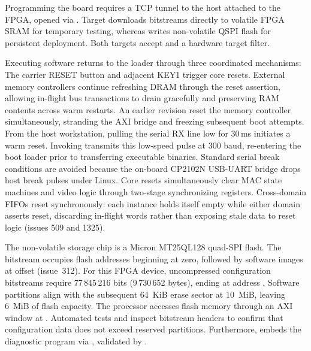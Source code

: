 \documentclass[journal,9pt]{IEEEtran}
\begin{document}
Programming the board requires a TCP tunnel to the host attached to the FPGA,
opened via . Target
 downloads bitstreams directly to volatile
FPGA SRAM for temporary testing, whereas 
writes non-volatile QSPI flash for persistent deployment. Both targets accept
 and a hardware target filter.

Executing software returns to the loader through three coordinated mechanisms:
The carrier RESET button and adjacent KEY1 trigger core resets. External memory
controllers continue refreshing DRAM through the reset assertion, allowing
in-flight bus transactions to drain gracefully and preserving RAM contents
across warm restarts. An earlier revision reset the memory controller
simultaneously, stranding the AXI bridge and freezing subsequent boot attempts.
From the host workstation, pulling the serial RX line low for 30\,ms initiates
a warm reset. Invoking  transmits this low-speed pulse at
300 baud, re-entering the boot loader prior to transferring executable
binaries. Standard serial break conditions are avoided because the on-board
CP2102N USB-UART bridge drops host break pulses under Linux.
Core resets simultaneously clear MAC state machines and video logic through
two-stage synchronizing registers. Cross-domain FIFOs reset synchronously: each
 instance holds itself empty while either domain asserts reset,
discarding in-flight words rather than exposing stale data to reset logic
(issues 509 and 1325).

The non-volatile storage chip is a Micron MT25QL128 quad-SPI flash. The bitstream
occupies flash addresses beginning at zero, followed by software images at
offset  (issue~312). For this FPGA device, uncompressed
configuration bitstreams require 77\,845\,216 bits (9\,730\,652 bytes), ending
at address . Software partitions align with the subsequent
64~KiB erase sector at 10~MiB, leaving 6~MiB of flash capacity. The processor
accesses flash memory through an AXI window at . Automated
tests  and
 inspect bitstream headers to
confirm that configuration data does not exceed reserved partitions.
Furthermore,  embeds the diagnostic program
 via , validated by
.
\end{document}
